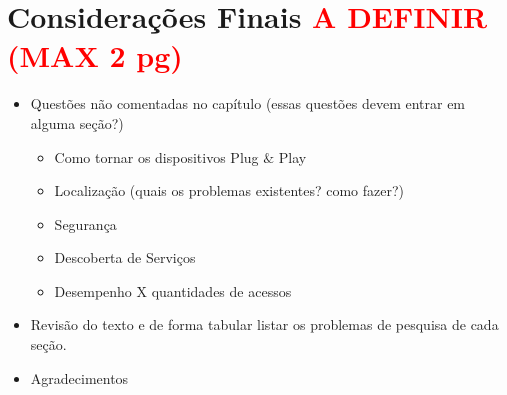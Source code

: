 
\section{Considerações Finais \textcolor{red}{A DEFINIR (MAX 2 pg)}}  
\label{sec:CF}

  \begin{itemize}
    \item Questões não comentadas no capítulo (essas questões devem entrar em 
alguma seção?)
    \begin{itemize}
      \item Como tornar os dispositivos Plug $\&$ Play
      \item Localização (quais os problemas existentes? como fazer?)
      \item Segurança
      \item Descoberta de Serviços
      \item Desempenho X quantidades de acessos
    \end{itemize}
    \item Revisão do texto e de forma tabular listar os problemas de pesquisa 
de cada seção.
    \item Agradecimentos
  \end{itemize}
  
